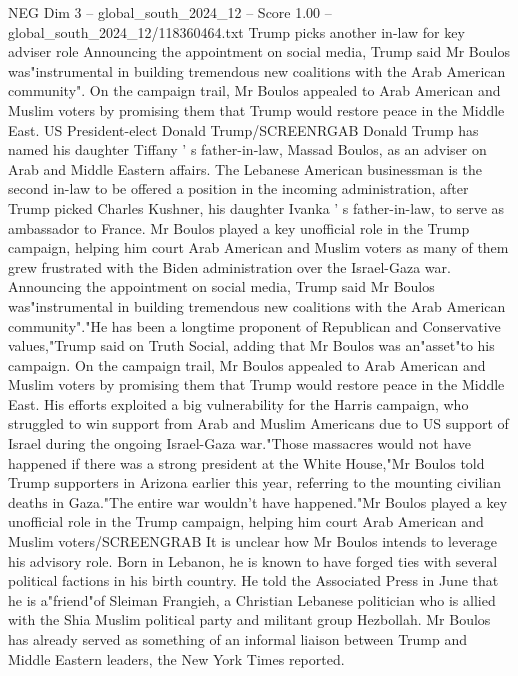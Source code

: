 \begin{textsample}{NEG Dim 3 – global\_south\_2024\_12 – Score 1.00 – global\_south\_2024\_12/118360464.txt}  \label{ex:f3_neg_066}
Trump picks another in-law for key adviser role Announcing the appointment on social media, Trump said Mr Boulos was"instrumental in building tremendous new coalitions with the Arab American community".
On the campaign trail, Mr Boulos appealed to Arab American and Muslim voters by promising them that Trump would restore peace in the Middle East.
US President-elect Donald Trump/SCREENRGAB Donald Trump has named his daughter Tiffany ' s father-in-law, Massad Boulos, as an adviser on Arab and Middle Eastern affairs.
The Lebanese American businessman is the second in-law to be offered a position in the incoming administration, after Trump picked Charles Kushner, his daughter Ivanka ' s father-in-law, to serve as ambassador to France.
Mr Boulos played a key unofficial role in the Trump campaign, helping him court Arab American and Muslim voters as many of them grew frustrated with the Biden administration over the Israel-Gaza war.
Announcing the appointment on social media, Trump said Mr Boulos was"instrumental in building tremendous new coalitions with the Arab American community"."He has been a longtime proponent of Republican and Conservative values,"Trump said on Truth Social, adding that Mr Boulos was an"asset"to his campaign.
On the campaign trail, Mr Boulos appealed to Arab American and Muslim voters by promising them that Trump would restore peace in the Middle East.
His efforts exploited a big vulnerability for the Harris campaign, who struggled to win support from Arab and Muslim Americans due to US support of Israel during the ongoing Israel-Gaza war."Those massacres would not have happened if there was a strong president at the White House,"Mr Boulos told Trump supporters in Arizona earlier this year, referring to the mounting civilian deaths in Gaza."The entire war wouldn't have happened."Mr Boulos played a key unofficial role in the Trump campaign, helping him court Arab American and Muslim voters/SCREENGRAB It is unclear how Mr Boulos intends to leverage his advisory role.
Born in Lebanon, he is known to have forged ties with several political factions in his birth country.
He told the Associated Press in June that he is a"friend"of Sleiman Frangieh, a Christian Lebanese politician who is allied with the Shia Muslim political party and militant group Hezbollah.
Mr Boulos has already served as something of an informal liaison between Trump and Middle Eastern leaders, the New York Times reported.

\end{textsample}
